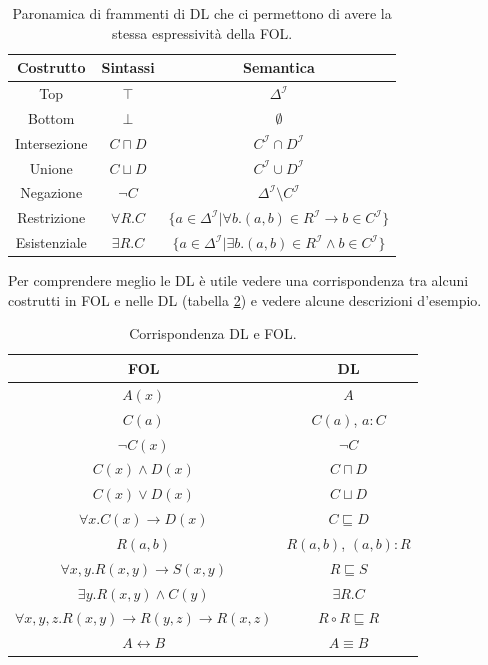 \documentclass{article}
\begin{document}
\begin{table}[h!t] 
    \centering
    \caption{Paronamica di frammenti di DL che ci permettono di avere la stessa espressività della FOL.}
    \label{tab:extend_DL}
    \begin{tabular}{c c c}
        \textbf{Costrutto} & \textbf{Sintassi} & \textbf{Semantica} \\
        \hline
        Top & $\top$ & $\Delta^{\mathcal{I}}$ \\
        Bottom & $\bot$ & $\emptyset$ \\
        Intersezione & $C \sqcap D$ & $C^{\mathcal{I}} \cap D^{\mathcal{I}}$ \\
        Unione & $C \sqcup D$ & $C^{\mathcal{I}} \cup D^{\mathcal{I}}$ \\ 
        Negazione & $\neg C$ & $\Delta^{\mathcal{I}} \setminus C^{\mathcal{I}}$ \\
        Restrizione & $\forall R.C$ & 
        $\{ a \in \Delta^{\mathcal{I}} | \forall b.(a,b) \in R^{\mathcal{I}} \rightarrow b \in C^{\mathcal{I}} \}$ \\
        Esistenziale & $\exists R.C$ & 
        $\{ a \in \Delta^{\mathcal{I}} | \exists b.(a,b) \in R^{\mathcal{I}} \land b \in C^{\mathcal{I}} \}$ \\
        \hline
    \end{tabular}
\end{table}

Per comprendere meglio le DL è utile vedere una corrispondenza tra alcuni costrutti in FOL e nelle DL (tabella \ref{tab:DL_FOL}) e vedere alcune descrizioni d'esempio. 

\begin{table}[h!t]
    \centering
    \caption{Corrispondenza DL e FOL.}
    \label{tab:DL_FOL}
    \begin{tabular}{c c}
        \hline 
        \textbf{FOL} & \textbf{DL} \\
        \hline
        $ A(x) $ & $ A $ \\
        $ C(a) $ & $ C(a) $, $ a:C $ \\
        $ \neg C(x) $ & $ \neg C $ \\
        $ C(x) \land D(x) $ & $ C \sqcap D $ \\
        $ C(x) \lor D(x) $ & $ C \sqcup D $ \\
        $ \forall x . C(x) \rightarrow D(x) $ & $ C \sqsubseteq D $ \\
        $ R(a,b) $ & $ R(a,b) $, $ (a,b):R $ \\
        $ \forall x, y . R(x,y) \rightarrow S(x,y) $ & $ R \sqsubseteq S $ \\
        $ \exists y . R(x,y) \land C(y) $ & $ \exists R.C $ \\
        $ \forall x, y, z . R(x,y) \rightarrow R(y,z) \rightarrow R(x,z) $ & $ R \circ R \sqsubseteq R $ \\
        $ A \leftrightarrow B $ & $ A \equiv B $ \\
        \hline
    \end{tabular}
\end{table}
\end{document}
